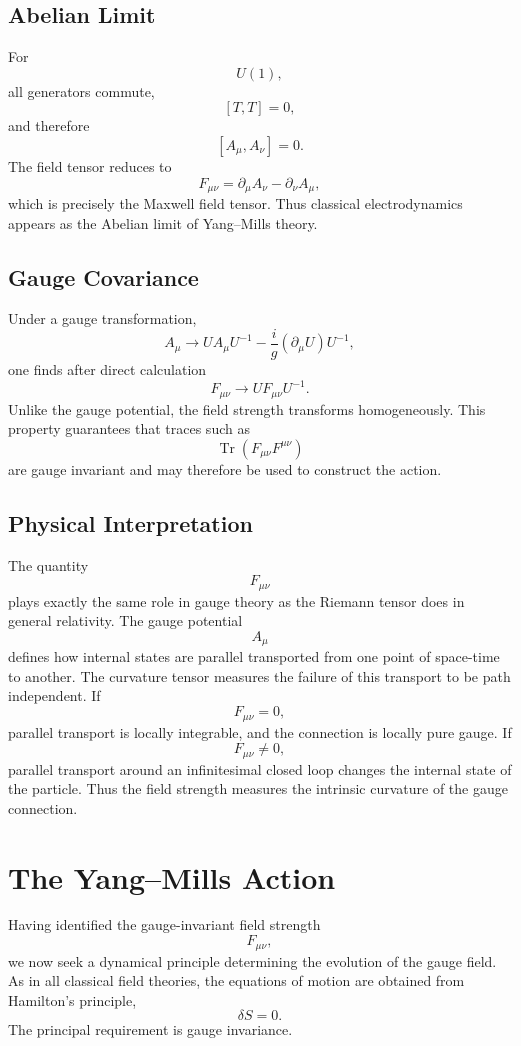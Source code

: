 \subsection{Abelian Limit}
For
\[U(1),\]
all generators commute,
\[[T,T]=0,\]
and therefore
\[[A_\mu,A_\nu]=0.\]
The field tensor reduces to
\[\boxed{F_{\mu\nu}=\partial_\mu A_\nu-\partial_\nu A_\mu,}\]
which is precisely the Maxwell field tensor.
Thus classical electrodynamics appears as the Abelian limit of
Yang--Mills theory.
\subsection{Gauge Covariance}
Under a gauge transformation,
\[A_\mu\rightarrow UA_\mu U^{-1}-\frac{i}{g}(\partial_\mu U)U^{-1},\]
one finds after direct calculation
\[\boxed{F_{\mu\nu}\rightarrow UF_{\mu\nu}U^{-1}.}\]
Unlike the gauge potential,
the field strength transforms homogeneously.
This property guarantees that traces such as
\[\operatorname{Tr}(F_{\mu\nu}F^{\mu\nu})\]
are gauge invariant and may therefore be used to construct the action.
\subsection{Physical Interpretation}
The quantity
\[F_{\mu\nu}\]
plays exactly the same role in gauge theory as the Riemann tensor does in
general relativity.
The gauge potential
\[A_\mu\]
defines how internal states are parallel transported from one point of
space-time to another.
The curvature tensor measures the failure of this transport to be path
independent.
If
\[F_{\mu\nu}=0,\]
parallel transport is locally integrable, and the connection is locally
pure gauge.
If
\[F_{\mu\nu}\neq0,\]
parallel transport around an infinitesimal closed loop changes the
internal state of the particle.
Thus the field strength measures the intrinsic curvature of the gauge
connection.
\section{The Yang--Mills Action}
Having identified the gauge-invariant field strength
\[F_{\mu\nu},\]
we now seek a dynamical principle determining the evolution of the gauge
field.
As in all classical field theories, the equations of motion are obtained
from Hamilton's principle,
\[\delta S=0.\]
The principal requirement is gauge invariance.
